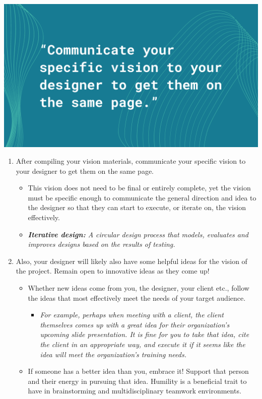 \documentclass[
]{book}
\providecommand{\tightlist}{%
  \setlength{\itemsep}{0pt}\setlength{\parskip}{0pt}}
\begin{document}
\includegraphics{images/Working-With-Graphic-Designers-Quote-3.png}

\begin{enumerate}
\def\labelenumi{\arabic{enumi}.}
\setcounter{enumi}{2}
\tightlist
\item
  After compiling your vision materials, communicate your specific vision to your designer to get them on the same page.

  \begin{itemize}
  \tightlist
  \item
    This vision does not need to be final or entirely complete, yet the vision must be specific enough to communicate the general direction and idea to the designer so that they can start to execute, or iterate on, the vision effectively.
  \item
    \emph{\textbf{Iterative design:} A circular design process that models, evaluates and improves designs based on the results of testing.}
  \end{itemize}
\item
  Also, your designer will likely also have some helpful ideas for the vision of the project. Remain open to innovative ideas as they come up!

  \begin{itemize}
  \tightlist
  \item
    Whether new ideas come from you, the designer, your client etc., follow the ideas that most effectively meet the needs of your target audience.

    \begin{itemize}
    \tightlist
    \item
      \emph{For example, perhaps when meeting with a client, the client themselves comes up with a great idea for their organization's upcoming slide presentation. It is fine for you to take that idea, cite the client in an appropriate way, and execute it if it seems like the idea will meet the organization's training needs.}
    \end{itemize}
  \item
    If someone has a better idea than you, embrace it! Support that person and their energy in pursuing that idea. Humility is a beneficial trait to have in brainstorming and multidisciplinary teamwork environments.
  \end{itemize}
\end{enumerate}
\end{document}
